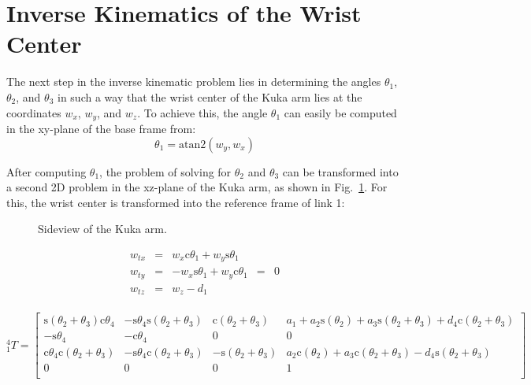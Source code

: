 \documentclass[twoside]{article}
\renewcommand{\c}{\text{c}}
\newcommand{\s}{\text{s}}
\newcommand{\T}[2]{\mbox{$_{#2}^{#1}{T}$}}
\newcommand{\figref}[1]{Fig.~\ref{fig:#1}}
\begin{document}
\section{Inverse Kinematics of the Wrist Center}
The next step in the inverse kinematic problem lies in determining the angles
$\theta_1$, $\theta_2$, and $\theta_3$ in such a way that the wrist center of the Kuka arm
lies at the coordinates $w_x$, $w_y$, and $w_z$. To achieve this, the angle $\theta_1$
can easily be computed in the xy-plane of the base frame from:
\begin{equation}
  \theta_1 = \text{atan2}(w_y, w_x)
\end{equation}

After computing $\theta_1$, the problem of solving for $\theta_2$ and $\theta_3$ can be
transformed into a second 2D problem in the xz-plane of the Kuka arm, as shown in \figref{sideview}.
For this, the wrist center is transformed into the reference frame of link 1:
\begin{figure}[ht]
  \centering
  \caption{Sideview of the Kuka arm.}
  \label{fig:sideview}
\end{figure}

\begin{equation}
\begin{matrix}
  w_{tx} & = & w_x \c\theta_1 + w_y \s\theta_1 & &\\
  w_{ty} & = & - w_x  \s\theta_1 + w_y \c\theta_1 & = &0\\
  w_{tz} & = & w_z - d_1&& \\
\end{matrix}
\end{equation}

\begin{equation}
\T{4}{1} =
\begin{bmatrix}
  \s(\theta_2 + \theta_3)\c\theta_4 & -\s\theta_4\s(\theta_2 + \theta_3) & \c(\theta_2 + \theta_3) & a_1 + a_2\s(\theta_2) + a_3\s(\theta_2 + \theta_3) + d_4\c(\theta_2 + \theta_3) \\
  -\s\theta_4 & -\c\theta_4 & 0 & 0 \\
  \c\theta_4\c(\theta_2 + \theta_3) & -\s\theta_4\c(\theta_2 + \theta_3) & -\s(\theta_2 + \theta_3) & a_2\c(\theta_2) + a_3\c(\theta_2 + \theta_3) - d_4\s(\theta_2 + \theta_3) \\
  0 & 0 & 0 & 1\\
  \label{eq:trans14}
\end{bmatrix}
\end{equation}
\end{document}
